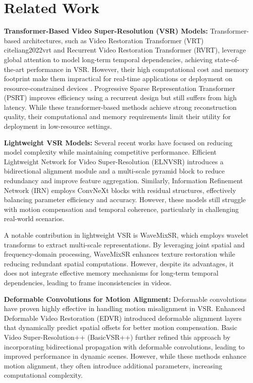 \section{Related Work}
\label{sec:related_work}

\textbf{Transformer-Based Video Super-Resolution (VSR) Models:} 
Transformer-based architectures, such as Video Restoration Transformer (VRT) cite{liang2022vrt} and Recurrent Video Restoration Transformer (RVRT)\cite{liang2022rvrt}, leverage global attention to model long-term temporal dependencies, achieving state-of-the-art performance in VSR. However, their high computational cost and memory footprint make them impractical for real-time applications or deployment on resource-constrained devices \cite{liu2025vsrdiff}. Progressive Sparse Representation Transformer (PSRT) \cite{psrt2023} improves efficiency using a recurrent design but still suffers from high latency. While these transformer-based methods achieve strong reconstruction quality, their computational and memory requirements limit their utility for deployment in low-resource settings.

\textbf{Lightweight VSR Models:} 
Several recent works have focused on reducing model complexity while maintaining competitive performance. Efficient Lightweight Network for Video Super-Resolution (ELNVSR) \cite{efficient2024lightweight} introduces a bidirectional alignment module and a multi-scale pyramid block to reduce redundancy and improve feature aggregation. Similarly, Information Refinement Network (IRN)\cite{zhang2023lightweight} employs ConvNeXt blocks with residual structures, effectively balancing parameter efficiency and accuracy. However, these models still struggle with motion compensation and temporal coherence, particularly in challenging real-world scenarios.  

A notable contribution in lightweight VSR is WaveMixSR\cite{wavemixsr2024}, which employs wavelet transforms to extract multi-scale representations. By leveraging joint spatial and frequency-domain processing, WaveMixSR enhances texture restoration while reducing redundant spatial computations. However, despite its advantages, it does not integrate effective memory mechanisms for long-term temporal dependencies, leading to frame inconsistencies in videos.

\textbf{Deformable Convolutions for Motion Alignment:}  
Deformable convolutions have proven highly effective in handling motion misalignment in VSR. Enhanced Deformable Video Restoration (EDVR) \cite{wang2019edvr} introduced deformable alignment layers that dynamically predict spatial offsets for better motion compensation. Basic Video Super-Resolution++ (BasicVSR++) \cite{chan2022basicvsrpp} further refined this approach by incorporating bidirectional propagation with deformable convolutions, leading to improved performance in dynamic scenes. However, while these methods enhance motion alignment, they often introduce additional parameters, increasing computational complexity.  

